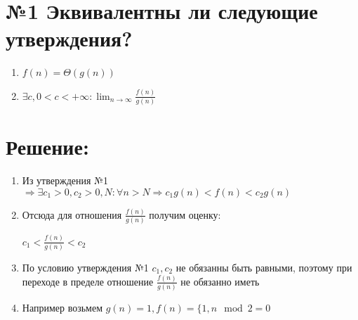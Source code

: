 
\section*{№1 Эквивалентны ли следующие утверждения?}

\begin{enumerate}
	\item $f(n) = \Theta(g(n))$
	\item $\exists c, 0 < c< +\infty: \lim _{n \to \infty}\frac{f(n)}{g(n)}  $
\end{enumerate}
\section*{Решение:}

\begin{enumerate}
\item Из утверждения №1 $\Rightarrow \exists c_1>0, c_2>0, N: \forall n>N \Rightarrow c_1g(n)<f(n)<c_2g(n) $

\item Отсюда для отношения $\frac{f(n)}{g(n)}$ получим оценку:

  $ c_1<\frac{f(n)}{g(n)}< c_2$

\item По условию утверждения №1  $  c_1 , c_2 $ не обязанны быть равными, поэтому при переходе в пределе отношение $\frac{f(n)}{g(n)}$ не обязанно иметь 


\item Например возьмем $g(n) = 1, f(n) = \lbrace 1, n\mod2=0  $

\end{enumerate}